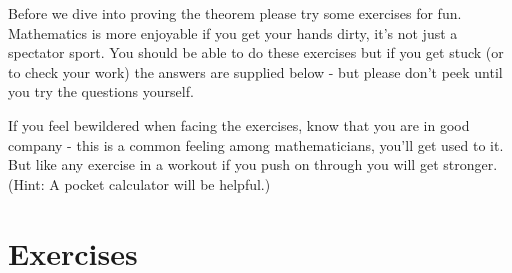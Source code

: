 \documentclass{article}
\begin{document}
Before we dive into proving the theorem please try some exercises for fun.
Mathematics is more enjoyable if you get your hands dirty, it's not
just a spectator sport.
You should be able to do these exercises but if you get stuck (or to
check your work) the
answers are supplied below - but please don't peek until you try the questions yourself.

If you feel bewildered when facing the exercises, know that you are in good
company - this is a common feeling among mathematicians, you'll get used to it.
But like any exercise in a workout if you push on through you will get stronger.
(Hint: A pocket calculator will be helpful.)

\section*{Exercises}
\end{document}
